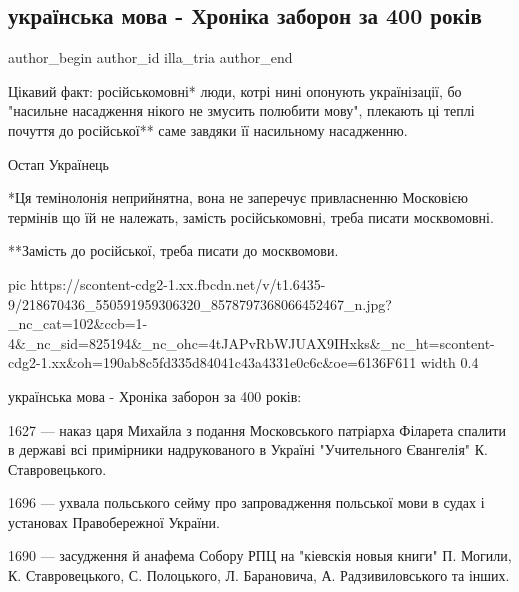  
 
 
 
 
 
\subsection{українська мова - Хроніка заборон за 400 років}
\label{sec:18_07_2021.fb.illa_tria.1.mova_zaborona}
 
\ifcmt
 author_begin
   author_id illa_tria
 author_end
\fi

Цікавий факт: російськомовні* люди, котрі нині опонують українізації, бо
"насильне насадження нікого не змусить полюбити мову", плекають ці теплі
почуття до російської** саме завдяки її насильному насадженню.

Остап Українець

*Ця темінолонія неприйнятна, вона не заперечує привласненню Московією термінів
що їй не належать, замість російськомовні, треба писати москвомовні.

**Замість до російської, треба писати до москвомови.

\ifcmt
  pic https://scontent-cdg2-1.xx.fbcdn.net/v/t1.6435-9/218670436_550591959306320_8578797368066452467_n.jpg?_nc_cat=102&ccb=1-4&_nc_sid=825194&_nc_ohc=4tJAPvRbWJUAX9IHxks&_nc_ht=scontent-cdg2-1.xx&oh=190ab8c5fd335d84041c43a4331e0c6c&oe=6136F611
  width 0.4
\fi

українська мова - Хроніка заборон за 400 років:

1627 — наказ царя Михайла з подання Московського патріарха Філарета спалити в державі всі примірники надрукованого в Україні "Учительного Євангелія" К. Ставровецького.

1696 — ухвала польського сейму про запровадження польської мови в судах і установах Правобережної України.

1690 — засудження й анафема Собору РПЦ на "кіевскія новыя книги" П. Могили, К. Ставровецького, С. Полоцького, Л. Барановича, А. Радзивиловського та інших.

